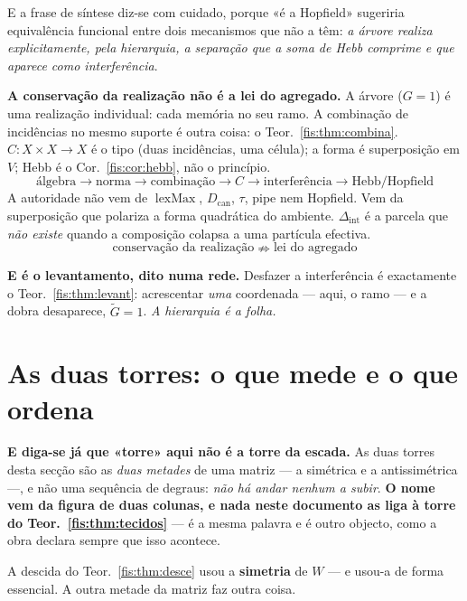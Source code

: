 \documentclass[livro.tex]{subfiles}
\begin{document}
\medskip\noindent E a frase de síntese diz-se com cuidado, porque «é a Hopfield»
sugeriria equivalência funcional entre dois mecanismos que não a têm:
\emph{a árvore realiza explicitamente, pela hierarquia, a separação que a soma de
Hebb comprime e que aparece como interferência}.

\medskip\noindent\textbf{A conservação da realização não é a lei do agregado.}
A árvore ($G=1$) é uma realização individual: cada memória no seu ramo. A
combinação de incidências no mesmo suporte é outra coisa: o
Teor.~\ref{fis:thm:combina}. $C\colon X\times X\to X$ é o tipo (duas
incidências, uma célula); a forma é superposição em $V$; Hebb é o
Cor.~\ref{fis:cor:hebb}, não o princípio.
\[
\boxed{\;
\text{álgebra}\to\text{norma}\to\text{combinação}\to C
\to\text{interferência}\to\text{Hebb/Hopfield}
\;}
\]
A autoridade não vem de $\operatorname{lexMax}$, $D_{\mathrm{can}}$, $\tau$,
pipe nem Hopfield. Vem da superposição que polariza a forma quadrática do
ambiente. $\Delta_{\mathrm{int}}$ é a parcela que \emph{não existe} quando a
composição colapsa a uma partícula efectiva.
\[
\boxed{\;\text{conservação da realização}\;\nRightarrow\;\text{lei do agregado}\;}
\]

\medskip\noindent\textbf{E é o levantamento, dito numa rede.} Desfazer a
interferência é exactamente o Teor.~\ref{fis:thm:levant}: acrescentar
\emph{uma} coordenada --- aqui, o ramo --- e a dobra desaparece,
$\tilde G=1$. \emph{A hierarquia é a folha.}

\section{As duas torres: o que mede e o que ordena}\label{fis:duastorres}

\noindent\textbf{E diga-se já que «torre» aqui não é a torre da escada.} As duas
torres desta secção são as \emph{duas metades} de uma matriz --- a simétrica e a
antissimétrica ---, e não uma sequência de degraus: \emph{não há andar nenhum a
subir}. \textbf{O nome vem da figura de duas colunas, e nada neste documento as
liga à torre do Teor.~\ref{fis:thm:tecidos}} --- é a mesma palavra e é outro
objecto, como a obra declara sempre que isso acontece.

\medskip\noindent A descida do Teor.~\ref{fis:thm:desce} usou a \textbf{simetria} de $W$
--- e usou-a de forma essencial. A outra metade da matriz faz outra coisa.
\end{document}
